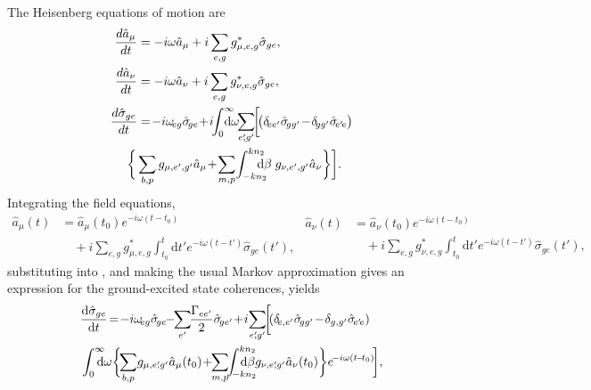 \documentclass[aps,pra,twocolumn]{revtex4-1} %
\newcommand{\der}[1]{\frac{d {#1}}{dt}}
\begin{document}
The Heisenberg equations of motion are
\begin{subequations}
	\begin{align}
		\der{\hat{a}_\mu} &= -i\omega \hat{a}_\mu +i\sum_{e,g} g_{\mu, e,g}^* \hat{\sigma}_{ge} \label{eq:da},\\
		\der{\hat{a}_\nu} &= -i\omega \hat{a}_\nu +i\sum_{e,g} g_{\nu, e,g}^*  \hat{\sigma}_{ge}\label{eq:danu},\\
		\der{\hat{\sigma}_{ge}} &=\! -i\omega\!_{eg} \hat{\sigma}\!_{ge} 
			\!+\! i\!\!\int_0^{\infty}\!\!\!\!\!\! \mathrm{d}\omega\!\! \sum_{e'\!\!,g'}\!\! \bigg[\! \big(\delta\!_{ee'} \hat{\sigma}\!_{gg'} \!-\! \delta\!_{gg'} \hat{\sigma}\!_{e'\!e} \big) \label{Eq::dsigma}  \nn\\
		&\!\!\!\!\! \bigg\{ \sum_{b,p}  g_{\mu, e',g'}\hat{a}_\mu \!+\! \sum_{m,p} \!\int_{-kn_2}^{kn_2}\!\!\!\!\!\! \mathrm{d}\beta \; g_{\nu, e',g'} \hat{a}_\nu \bigg\} \bigg]. 
	\end{align}
\end{subequations}
Integrating the field equations, 
\begin{subequations}\label{eq:aout1}
\begin{align}
\hat{a}_\mu(t) &= \hat{a}_\mu(t_0) e^{-i\omega (t-t_0)} \nonumber\\
&\quad +i \sum_{e,g} g_{\mu,e,g}^* \int_{t_0}^t 
\mathrm{d} t' e^{-i\omega (t-t')}\hat{\sigma}_{ge}(t'), \label{Eq::aguidedEOM}
\end{align}
\begin{align}
\hat{a}_\nu (t) &= \hat{a}_\nu (t_0) e^{-i\omega (t-t_0)} \nonumber\\
&\quad +i \sum_{e,g} g_{\nu,e,g}^* \int_{t_0}^t \mathrm{d} 
t' e^{-i\omega (t-t')}\hat{\sigma}_{ge}(t'),
\end{align}
\end{subequations}
substituting into , and making the usual Markov approximation gives an expression for the ground-excited state coherences, yields
\begin{align}
&\dt{\hat{\sigma}_{ge}} \!=\!-i\omega\!_{eg} 
\hat{\sigma}\!_{ge}\!\!-\!\!\sum_{e'}\!\!\frac{\Gamma_{ee'}}{2}\hat{\sigma}\!_{ge'}  
\!+\!i\! \sum_{e'\!\!,g'}\!\!\bigg[\! (\delta\!_{e,e'} \hat{\sigma}\!_{gg'} \!-\! \delta_{g,g'} 
\hat{\sigma}\!_{e'\!e})\nn\\
&\int_0^{\infty}\!\!\!\!\!\mathrm{d}\omega \bigg\{\!\!\sum_{b,p} \! g_{\mu, e'\!\!,g'} \hat{a}_\mu (t_0) 
\!+\!\!\sum_{m,p}\!\!  \int_{\!-kn_2}^{kn_2}\!\!\!\!\!\!\!\!\!\mathrm{d}\beta  g_{\nu, e'\!\!,g'} \hat{a}_\nu(t_0) \bigg\} e^{\!-i\omega 
(t\!-\!t_0)} \!\bigg], \nonumber
\end{align}
\end{document}

